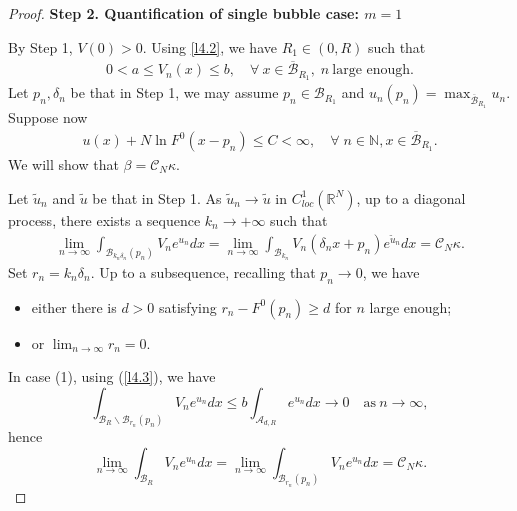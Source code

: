 \documentclass[11pt]{amsart}
\numberwithin{equation}{section}
\newcommand{\N}{\mathbb{N}}
\newcommand{\R}{\mathbb{R}}
\begin{document}
\begin{proof}
\medskip
\textbf{Step 2. Quantification of single bubble case: $m=1$}

By Step 1, $V(0) > 0$. Using \eqref{l4.2}, we have $R_1 \in (0, R)$ such that
\begin{align}\label{l4.4.2}
0 < a\leq V_{n}(x)\leq b, \quad\forall ~x\in \overline{\mathcal{B}}_{R_1},\; n~\mbox{large enough}.
\end{align}
Let $p_n, \delta_n$ be that in Step 1, we may assume $p_n \in \mathcal{B}_{R_1}$ and $u_{n}(p_n)=\max_{\overline{\mathcal{B}}_{R_1}}u_{n}$.
Suppose now
\begin{align}
\label{3.8new}
u(x) + N\ln F^0(x - p_n) \leq C < \infty, \quad \forall\; n \in \N, x\in \overline{\mathcal{B}}_{R_1}.
\end{align}
We will show that $\beta = {\mathcal C}_N\kappa$.

Let $\widetilde{u}_{n}$ and $\widetilde u$ be that in Step 1. As $\widetilde{u}_{n} \rightarrow \widetilde u$ in $C^1_{loc}(\R^N)$, up to a diagonal process, there exists a sequence $k_n \to +\infty$ such that
\begin{align}
\label{3.7new}
\lim_{n\rightarrow\infty}\int_{\mathcal{B}_{k_{n}\delta_{n}}(p_{n})}V_{n}e^{u_{n}}dx = \lim_{n\rightarrow\infty}\int_{\mathcal{B}_{k_{n}}}V_{n}(\delta_n x + p_n)e^{\widetilde u_{n}}dx = \mathcal{C}_{N}\kappa .
\end{align}
Set $r_{n} =k_{n}\delta_{n}$. Up to a subsequence, recalling that $p_n \to 0$, we have
\begin{itemize}
\item[(1)] either there is $d > 0$ satisfying $r_n - F^0(p_n) \geq d$ for $n$ large enough;
\item[(2)] or $\lim_{n\to\infty} r_n = 0$.
\end{itemize}

In case (1), using (\ref{l4.3}), we have
$$\int_{\mathcal{B}_R\backslash {\mathcal B}_{r_n}(p_n)}V_{n}e^{u_{n}}dx \leq b\int_{\mathcal{A}_{d, R}}e^{u_{n}}dx\rightarrow 0 \quad\mbox{as}~ n\rightarrow\infty,$$
hence
$$\lim_{n\to\infty}\int_{\mathcal{B}_{R}}V_{n}e^{u_{n}}dx = \lim_{n\to\infty}\int_{\mathcal{B}_{r_{n}}(p_n)}V_{n}e^{u_{n}}dx = \mathcal{C}_{N}\kappa.$$


\end{proof}
\end{document}
